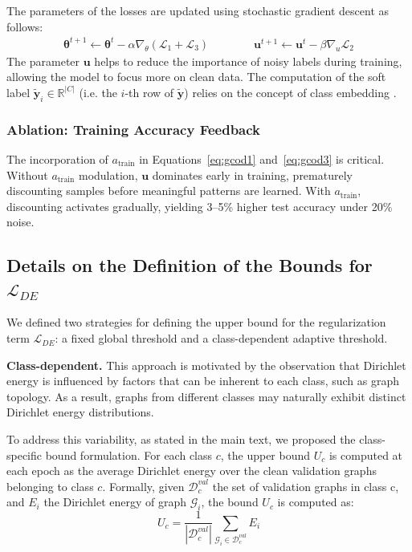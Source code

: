{The parameters of the losses are updated using stochastic gradient descent as follows:
\begin{align}
\mathbf{\theta}^{t+1} \gets \mathbf{\theta}^t - \alpha \nabla_\theta (\mathcal{L}_1 + \mathcal{L}_3) \qquad \qquad \mathbf{u}^{t+1} \gets \mathbf{u}^t - \beta \nabla_u \mathcal{L}_2
\end{align}
The parameter \( \mathbf{u} \) helps to reduce the importance of noisy labels during training, allowing the model to focus more on clean data. The computation of the soft label $\mathbf{\tilde{y}}_i \in \mathbb{R}^{|C|}$ (i.e. the $i$-th row of $\mathbf{\tilde{y}}$) relies on the concept of class embedding \cite{wani2023combining}. 

\subsubsection{Ablation: Training Accuracy Feedback}

The incorporation of $a_{\text{train}}$ in Equations~\ref{eq:gcod1} and~\ref{eq:gcod3} is critical. Without $a_{\text{train}}$ modulation, $\mathbf{u}$ dominates early in training, prematurely discounting samples before meaningful patterns are learned. With $a_{\text{train}}$, discounting activates gradually, yielding 3--5\% higher test accuracy under 20\% noise.

\subsection{Details on the Definition of the Bounds for $\mathcal L_{DE}$}
\label{appendix:details_dirichlet_regularization_bounds}
We defined two strategies for defining the upper bound for the regularization term $\mathcal L_{DE}$: a fixed global threshold and a class-dependent adaptive threshold.

\textbf{Class-dependent.} This approach is motivated by the observation that Dirichlet energy is influenced by factors that can be inherent to each class, such as graph topology. As a result, graphs from different classes may naturally exhibit distinct Dirichlet energy distributions.

To address this variability, as stated in the main text, we proposed the class-specific bound formulation. For each class $c$, the upper bound $U_c$ is computed at each epoch as the average Dirichlet energy over the clean validation graphs belonging to class $c$. Formally, given $\mathcal D^{val}_c$ the set of validation graphs in class c, and $E_i$ the Dirichlet energy of graph $\mathcal G_i$, the bound $U_c$ is computed as:
\begin{equation}
    U_c = \frac 1 {|\mathcal D^{val}_c|} \sum_{\mathcal G_i \in \mathcal D^{val}_c} E_i
\end{equation}

}
